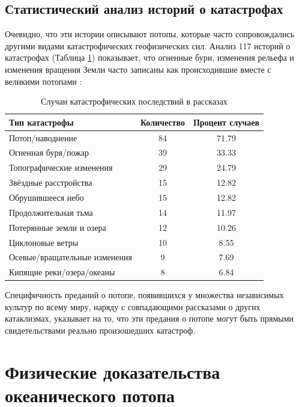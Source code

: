 \documentclass[10pt,twocolumn,letterpaper]{article}
\begin{document}
\subsection{Статистический анализ историй о катастрофах}

Очевидно, что эти истории описывают потопы, которые часто сопровождались другими видами катастрофических геофизических сил. Анализ 117 историй о катастрофах (Таблица \ref{tab: 1}) показывает, что огненные бури, изменения рельефа и изменения вращения Земли часто записаны как происходившие вместе с великими потопами \cite{14}:

\begin{table}[ht]
\begin{center}
\renewcommand{\arraystretch}{1.2}  %
\begin{tabular}{|l|c|c|}
\hline
\textbf{Тип катастрофы} & \textbf{Количество} & \textbf{Процент случаев} \\
\hline\hline
Потоп/наводнение            & 84 & 71.79 \\
Огненная буря/пожар         & 39 & 33.33 \\
Топографические изменения     & 29 & 24.79 \\
Звёздные расстройства        & 15 & 12.82 \\
Обрушившееся небо           & 15 & 12.82 \\
Продолжительная тьма        & 14 & 11.97 \\
Потерянные земли и озера   & 12 & 10.26 \\
Циклоновые ветры           & 10 & 8.55  \\
Осевые/вращательные изменения  & 9 & 7.69  \\
Кипящие реки/озера/океаны  & 8 & 6.84 \\
\hline
\end{tabular}
\end{center}
\caption{Случаи катастрофических последствий в рассказах}
\label{tab: 1}
\end{table}

Специфичность преданий о потопе, появившихся у множества независимых культур по всему миру, наряду с совпадающими рассказами о других катаклизмах, указывает на то, что эти предания о потопе могут быть прямыми свидетельствами реально произошедших катастроф.

\section{Физические доказательства океанического потопа}
\end{document}
